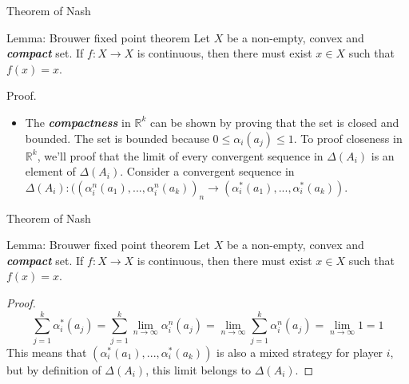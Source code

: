 \documentclass{beamer}
\newcommand{\R}{\mathbb{R}}
\begin{document}
\begin{frame}{Theorem of Nash}
\begin{block}{Lemma: Brouwer fixed point theorem}
Let $X$ be a non-empty, convex and \textbf{\emph{compact}} set. If $f : X \rightarrow X$ is continuous, then there must exist $x \in X$ such that $f(x) = x$.
\end{block}
\begin{block}{Proof.}
\begin{itemize}
         \item  The \textbf{\emph{compactness}} in $\R^k$ can be shown by proving that the set is closed and bounded. The set is bounded because $0 \leq \alpha_i(a_j) \leq 1$. To proof closeness in $\R^k$, we'll proof that the limit of every convergent sequence in $\Delta(A_i)$ is an element of $\Delta(A_i)$. Consider a convergent sequence in $\Delta(A_i): ((\alpha^n_i(a_1),...,\alpha^n_i(a_k))_n\rightarrow(\alpha^*_i(a_1),...,\alpha^*_i(a_k))$. 

      \end{itemize}
\end{block}
\end{frame}

\begin{frame}{Theorem of Nash}

\begin{block}{Lemma: Brouwer fixed point theorem}
Let $X$ be a non-empty, convex and \emph{\textbf{compact}} set. If $f : X \rightarrow X$ is continuous, then there must exist $x \in X$ such that $f(x) = x$.
\end{block}
\begin{proof}
         $$\sum_{j=1}^k{\alpha^*_i(a_j)}  = \displaystyle\sum_{j=1}^k{\lim_{n\rightarrow\infty}{\alpha^n_i(a_j)}} = \displaystyle\lim_{n\rightarrow\infty}{\sum_{j=1}^k\alpha^n_i(a_j)} = \displaystyle\lim_{n\rightarrow\infty}{1} = 1$$
                        This means that $(\alpha^*_i(a_1),...,\alpha^*_i(a_k))$ is also a mixed strategy for player $i$, but by definition of $\Delta(A_i)$, this limit belongs to $\Delta(A_i)$.
\end{proof}
\end{frame}
\end{document}
